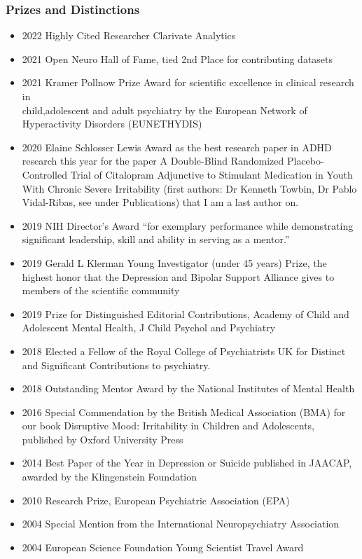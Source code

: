 \documentclass[
]{article}
\providecommand{\tightlist}{%
  \setlength{\itemsep}{0pt}\setlength{\parskip}{0pt}}
\begin{document}
\hypertarget{prizes-and-distinctions}{%
\subsubsection{Prizes and Distinctions}\label{prizes-and-distinctions}}

\begin{itemize}
\tightlist
\item
  2022 Highly Cited Researcher Clarivate Analytics
\item
  2021 Open Neuro Hall of Fame, tied 2nd Place for contributing datasets
\item
  2021 Kramer Pollnow Prize Award for scientific excellence in clinical
  research in\\
  child,adolescent and adult psychiatry by the European Network of
  Hyperactivity Disorders (EUNETHYDIS)
\item
  2020 Elaine Schlosser Lewis Award as the best research paper in ADHD
  research this year for the paper A Double-Blind Randomized
  Placebo-Controlled Trial of Citalopram Adjunctive to Stimulant
  Medication in Youth With Chronic Severe Irritability (first authors:
  Dr Kenneth Towbin, Dr Pablo Vidal-Ribas, see under Publications) that
  I am a last author on.
\item
  2019 NIH Director's Award ``for exemplary performance while
  demonstrating significant leadership, skill and ability in serving as
  a mentor.''\\
\item
  2019 Gerald L Klerman Young Investigator (under 45 years) Prize, the
  highest honor that the Depression and Bipolar Support Alliance gives
  to members of the scientific community
\item
  2019 Prize for Distinguished Editorial Contributions, Academy of Child
  and Adolescent Mental Health, J Child Psychol and Psychiatry
\item
  2018 Elected a Fellow of the Royal College of Psychiatrists UK for
  Distinct and Significant Contributions to psychiatry.
\item
  2018 Outstanding Mentor Award by the National Institutes of Mental
  Health
\item
  2016 Special Commendation by the British Medical Association (BMA) for
  our book Disruptive Mood: Irritability in Children and Adolescents,
  published by Oxford University Press
\item
  2014 Best Paper of the Year in Depression or Suicide published in
  JAACAP, awarded by the Klingenstein Foundation
\item
  2010 Research Prize, European Psychiatric Association (EPA)\\
\item
  2004 Special Mention from the International Neuropsychiatry
  Association
\item
  2004 European Science Foundation Young Scientist Travel Award
\end{itemize}
\end{document}
